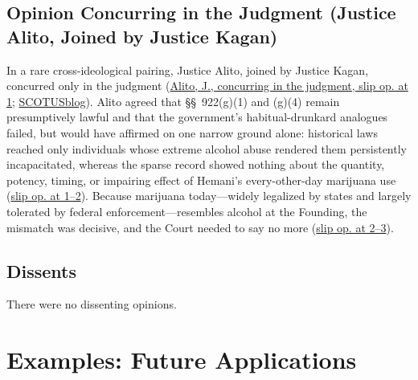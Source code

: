 \documentclass[12pt]{article}
\begin{document}
\subsection{Opinion Concurring in the Judgment (Justice Alito, Joined by Justice Kagan)}

In a rare cross-ideological pairing, Justice Alito, joined by Justice Kagan, concurred only in the judgment (\href{https://supreme.justia.com/cases/federal/us/608/24-1234/}{Alito, J., concurring in the judgment, slip op. at 1}; \href{https://www.scotusblog.com/2026/06/hemani-proving-the-reason-not-just-naming-it/}{SCOTUSblog}). Alito agreed that \S\S~922(g)(1) and (g)(4) remain presumptively lawful and that the government's habitual-drunkard analogues failed, but would have affirmed on one narrow ground alone: historical laws reached only individuals whose extreme alcohol abuse rendered them persistently incapacitated, whereas the sparse record showed nothing about the quantity, potency, timing, or impairing effect of Hemani's every-other-day marijuana use (\href{https://supreme.justia.com/cases/federal/us/608/24-1234/}{slip op. at 1--2}). Because marijuana today---widely legalized by states and largely tolerated by federal enforcement---resembles alcohol at the Founding, the mismatch was decisive, and the Court needed to say no more (\href{https://supreme.justia.com/cases/federal/us/608/24-1234/}{slip op. at 2--3}).

\subsection{Dissents}

There were no dissenting opinions.

\section{Examples: Future Applications}
\end{document}
